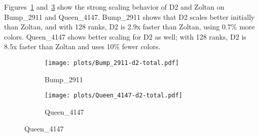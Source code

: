 Figures~\ref{IAB:Bumpstrong} and~\ref{IAB:queenstrong} show the strong scaling behavior of D2 and Zoltan on Bump\_2911 and Queen\_4147.
Bump\_2911 shows that D2 scales better initially than Zoltan, and with 128 ranks, D2 is 2.9x faster than Zoltan, using 0.7\% more colors.
Queen\_4147 shows better scaling for D2 as well; with 128 ranks, D2 is 8.5x faster than Zoltan and uses 10\% fewer colors.




\begin{figure}[h]
  \centering
  \caption{D2 and Zoltan strong scaling for distance-2 coloring.}
  \label{IAB:distance2strong}
  \begin{subfigure}[b]{0.25\textwidth}
    \centering
    \texttt{[image: plots/Bump\_2911-d2-total.pdf]}
    \caption{Bump\_2911}
    \label{IAB:Bumpstrong}
  \end{subfigure}%
  \begin{subfigure}[b]{0.22\textwidth}
    \centering
    \texttt{[image: plots/Queen\_4147-d2-total.pdf]}
    \caption{Queen\_4147}
    \label{IAB:queenstrong}
  \end{subfigure}
\end{figure}

